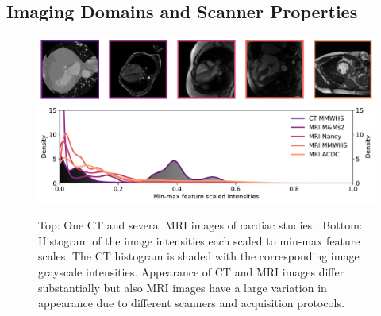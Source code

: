     \subsection{Imaging Domains and Scanner Properties} %

        \begin{figure}
            \begin{minipage}{\textwidth}
                \centering
                \includegraphics[width=.89\textwidth]{sections/02_background/figures/contrast_imgs.pdf}
                \includegraphics[width=\textwidth]{sections/02_background/figures/contrast_histograms.pdf}
                \caption{Top: One \ac{CT} and several \ac{MRI} images of cardiac studies \citep{xx,xx,xx,xx}. Bottom: Histogram of the image intensities each scaled to min-max feature scales. The \ac{CT} histogram is shaded with the corresponding image grayscale intensities. Appearance of \ac{CT} and \ac{MRI} images differ substantially but also \ac{MRI} images have a large variation in appearance due to different scanners and acquisition protocols.}
                \label{fig:domain_contrast}
            \end{minipage}
        \end{figure}


        \citep{withers2021x}




